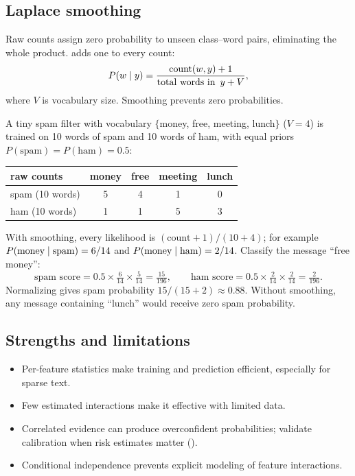 \subsection{Laplace smoothing}

Raw counts assign zero probability to unseen class--word pairs, eliminating the whole product.  adds one to every count:
\[
  P(w\mathrel{|} y)
  =\frac{\operatorname{count}(w,y)+1}
        {\operatorname{total\ words\ in\ }y+V},
\]
where $V$ is vocabulary size. Smoothing prevents zero probabilities.

\begin{workedexample}
A tiny spam filter with vocabulary $\{$money, free, meeting, lunch$\}$ ($V=4$) is trained on 10 words of spam and 10 words of ham, with equal priors $P(\text{spam})=P(\text{ham})=0.5$:

\begin{mltable}
\begin{tabular}{@{}lcccc@{}}
\toprule
\rowcolor{MLPaleBlue!92}
raw counts & money & free & meeting & lunch \\
\midrule
spam (10 words) & 5 & 4 & 1 & 0 \\
ham (10 words) & 1 & 1 & 5 & 3 \\
\bottomrule
\end{tabular}
\end{mltable}

With smoothing, every likelihood is $(\text{count}+1)/(10+4)$; for example $P(\text{money}\mathrel{|}\text{spam})=6/14$ and $P(\text{money}\mathrel{|}\text{ham})=2/14$. Classify the message ``free money'':
\[
  \text{spam score}=0.5\times\tfrac{6}{14}\times\tfrac{5}{14}
  =\tfrac{15}{196},
  \qquad
  \text{ham score}=0.5\times\tfrac{2}{14}\times\tfrac{2}{14}
  =\tfrac{2}{196}.
\]
Normalizing gives spam probability $15/(15+2)\approx0.88$. Without smoothing, any message containing ``lunch'' would receive zero spam probability.
\end{workedexample}

\subsection{Strengths and limitations}

\begin{itemize}
  \item Per-feature statistics make training and prediction efficient, especially for sparse text.
  \item Few estimated interactions make it effective with limited data.
  \item Correlated evidence can produce overconfident probabilities; validate calibration when risk estimates matter ().
  \item Conditional independence prevents explicit modeling of feature interactions.
\end{itemize}

